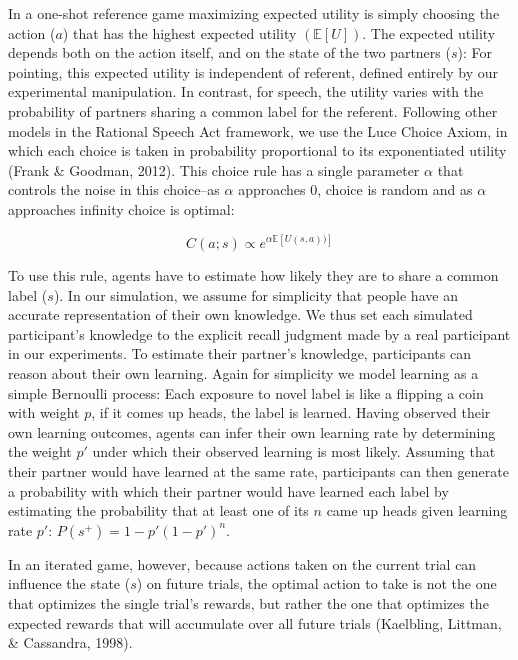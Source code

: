 \documentclass[10pt, letterpaper]{article}
\begin{document}
\newcommand{\E}[1]{\mathbb{E}\left[ #1 \right]}

In a one-shot reference game maximizing expected utility is simply
choosing the action (\(a\)) that has the highest expected utility
\((\mathbb{E}\left[ U \right])\). The expected utility depends both on
the action itself, and on the state of the two partners (\(s\)): For
pointing, this expected utility is independent of referent, defined
entirely by our experimental manipulation. In contrast, for speech, the
utility varies with the probability of partners sharing a common label
for the referent. Following other models in the Rational Speech Act
framework, we use the Luce Choice Axiom, in which each choice is taken
in probability proportional to its exponentiated utility (Frank \&
Goodman, 2012). This choice rule has a single parameter \(\alpha\) that
controls the noise in this choice--as \(\alpha\) approaches 0, choice is
random and as \(\alpha\) approaches infinity choice is optimal:

\[ 
C\left(a;s\right) \propto e^{\alpha \mathbb{E}\left[ U \left(s,a\right)) \right]}
\]

To use this rule, agents have to estimate how likely they are to share a
common label (\(s\)). In our simulation, we assume for simplicity that
people have an accurate representation of their own knowledge. We thus
set each simulated participant's knowledge to the explicit recall
judgment made by a real participant in our experiments. To estimate
their partner's knowledge, participants can reason about their own
learning. Again for simplicity we model learning as a simple Bernoulli
process: Each exposure to novel label is like a flipping a coin with
weight \(p\), if it comes up heads, the label is learned. Having
observed their own learning outcomes, agents can infer their own
learning rate by determining the weight \(p'\) under which their
observed learning is most likely. Assuming that their partner would have
learned at the same rate, participants can then generate a probability
with which their partner would have learned each label by estimating the
probability that at least one of its \(n\) came up heads given learning
rate \(p'\): \(P\left(s^{+}\right)=1-p'\left( 1-p' \right)^{n}\).

In an iterated game, however, because actions taken on the current trial
can influence the state (\(s\)) on future trials, the optimal action to
take is not the one that optimizes the single trial's rewards, but
rather the one that optimizes the expected rewards that will accumulate
over all future trials (Kaelbling, Littman, \& Cassandra, 1998).
\end{document}
